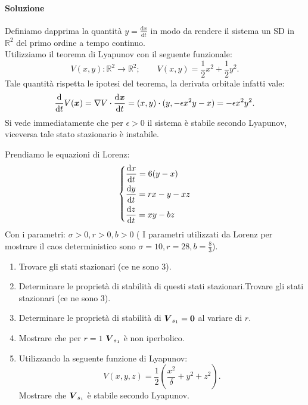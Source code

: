 \paragraph{Soluzione}%
Definiamo dapprima la quantità $y = \frac{\text{d} x}{\text{d} t}$ in modo da rendere il sistema un SD in $\mathbb{R}^2$ del primo ordine a tempo continuo.\\
Utilizziamo il teorema di Lyapunov con il seguente funzionale:
\[
    V(x, y): \mathbb{R}^2\to \mathbb{R}^2; \qquad V(x,y) = \frac{1}{2}x^2+\frac{1}{2}y^2
.\] 
Tale quantità rispetta le ipotesi del teorema, la derivata orbitale infatti vale:
\[
    \frac{\text{d} }{\text{d} t} V(\boldsymbol{x}) = \nabla V \cdot \frac{\text{d} \boldsymbol{x}}{\text{d} t} =
    (x,y) \cdot (y, -\epsilon x^2y - x) = -\epsilon x^2y^2 
.\] 
Si vede immediatamente che per $\epsilon >0$ il sistema è stabile secondo Lyapunov, viceversa tale stato stazionario è instabile.
\begin{ex}
   Prendiamo le equazioni di Lorenz: 
   \[
   \begin{dcases}
       \frac{\text{d} x}{\text{d} t} = 6(y-x) \\
       \frac{\text{d} y}{\text{d} t} = r x - y - xz \\
       \frac{\text{d} z}{\text{d} t} = xy - bz
   \end{dcases}
   \]
   Con i parametri: $\sigma  >0, r > 0 , b > 0$ ( I parametri utilizzati da Lorenz per mostrare il caos deterministico sono $\sigma  = 10, r = 28, b = \frac{8}{3}$).
   \begin{enumerate}
       \item Trovare gli stati stazionari (ce ne sono 3).
       \item Determinare le proprietà di stabilità di questi stati stazionari.Trovare gli stati stazionari (ce ne sono 3).
       \item Determinare le proprietà di stabilità di $\boldsymbol{V}_{s_1} = \boldsymbol{0}$ al variare di $r$.
       \item Mostrare che per $r = 1$ $\boldsymbol{V}_{s_1}$ è non iperbolico.
       \item Utilizzando la seguente funzione di Lyapunov:
	   \[
	       V(x, y, z) = \frac{1}{2}\left(\frac{x^2}{\delta} + y^2 + z^2\right)
	   .\] 
	 Mostrare che $\boldsymbol{V}_{s_1}$ è stabile secondo Lyapunov.
   \end{enumerate}
\end{ex}
\noindent
